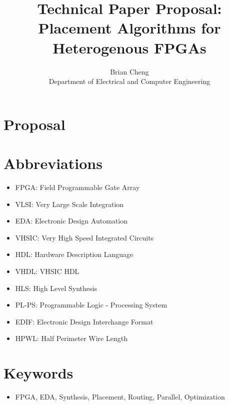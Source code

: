 \documentclass{article}
\begin{document}
\title{Technical Paper Proposal: \\ Placement Algorithms for Heterogenous FPGAs}
\author{Brian Cheng \\ Department of Electrical and Computer Engineering}


\date{}
\maketitle

\section{Proposal}



\section{Abbreviations}
\begin{itemize}[label={--}, left=0.25cm] %
    \item FPGA: Field Programmable Gate Array
    \item VLSI: Very Large Scale Integration
    \item EDA: Electronic Design Automation
    \item VHSIC: Very High Speed Integrated Circuits
    \item HDL: Hardware Description Language
    \item VHDL: VHSIC HDL
    \item HLS: High Level Synthesis
    \item PL-PS: Programmable Logic - Processing System
    \item EDIF: Electronic Design Interchange Format
    \item HPWL: Half Perimeter Wire Length
\end{itemize}

\section{Keywords}
\begin{itemize}
    \item FPGA, EDA, Synthesis, Placement, Routing, Parallel, Optimization
\end{itemize}
\end{document}
